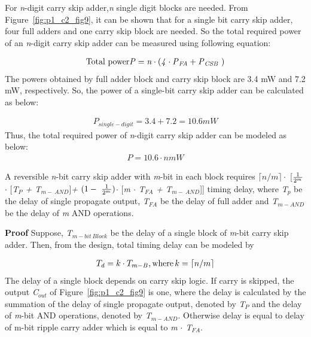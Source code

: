 For {\it n}-digit carry skip adder,{\it n} single digit blocks are needed. From Figure~\ref{fig:p1_c2_fig9}, it can be shown that for a single bit carry skip adder, four full adders and one carry skip block are needed. So the total required power of an {\it n}-digit carry skip adder can be measured using following equation:

\begin{align*}
\textnormal{Total power} {\it P = n \cdot (4 \cdot P{}_{FA}+ P{}_{CSB\ })}
\end{align*}
\textnormal{
The powers obtained by full adder block and carry skip block are { 3.4 mW} and {7.2 mW}, respectively. So, the power of a single-bit carry skip adder can be calculated as below:}

\begin{align*}
P{}_{single-digit} = 3.4 +7.2 = 10.6 mW
\end{align*}
\textnormal{
Thus, the total required power of {\it n}-digit carry skip adder can be modeled as below:}
\begin{align*}
P = 10.6 \cdot n mW
\end{align*}

\begin{property}\textnormal{
A reversible {\it n}-bit carry skip adder with {\it m}-bit in each block requires $\lceil{n/m}\rceil{\cdot}$ [${{1}\over {2^m}}${\it $\cdot$ }[{\it T${}_{P}$ + T${}_{m-\ AND}$}]{\it + }$(1-\ {{1}\over {2^m}})${\it $\cdot$ }[{\it m $\cdot$ T${}_{FA}$ + T${}_{m-\ AND}$}]] timing delay, where {\it T${}_{p}$} be the delay of single propagate output, {\it T${}_{FA}$} be the delay of full adder and {\it T${}_{m-AND}$} be the delay of {\it m} AND operations.}
\end{property}

\noindent\textbf{Proof}\textnormal{
Suppose, {\it T${}_{m-bit\ Block}$} be the delay of a single block of {\it m}-bit carry skip adder. Then, from the design, total timing delay can be modeled by}

\begin{align*}
T_{d} = k \cdot T_{m-B}, \textnormal{where} \, k=\lceil{n/m}\rceil
\end{align*}
\textnormal{
The delay of a single block depends on carry skip logic. If carry is skipped, the output {\it C${}_{out}$} of Figure~\ref{fig:p1_c2_fig9} is one, where the delay is calculated by the summation of the delay of single propagate output, denoted by {\it T${}_{P}$} and the delay of {\it m}-bit AND operations, denoted by {\it T${}_{m-AND}$}. Otherwise delay is equal to delay of m-bit ripple carry adder which is equal to {\it m $\cdot$ T${}_{FA}$}.}

